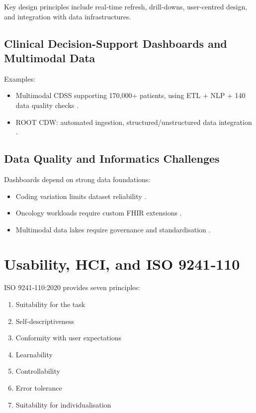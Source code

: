 Key design principles include real‑time refresh, drill‑downs, user-centred design, and integration with data infrastructures.

\subsection{Clinical Decision-Support Dashboards and Multimodal Data}

Examples:

\begin{itemize}
    \item Multimodal CDSS supporting 170,000+ patients, using ETL + NLP + 140 data quality checks \citep{chang2025}.
    \item ROOT CDW: automated ingestion, structured/unstructured data integration \citep{jung2021}.
\end{itemize}

\subsection{Data Quality and Informatics Challenges}

Dashboards depend on strong data foundations:

\begin{itemize}
    \item Coding variation limits dataset reliability \citep{varma2026}.
    \item Oncology workloads require custom FHIR extensions \citep{guilbert2024}.
    \item Multimodal data lakes require governance and standardisation \citep{conway2025}.
\end{itemize}

\section{Usability, HCI, and ISO 9241‑110}

ISO 9241‑110:2020 \citep{internationalorganizationforstandardization2020} provides seven principles:

\begin{enumerate}
    \item Suitability for the task
    \item Self-descriptiveness
    \item Conformity with user expectations
    \item Learnability
    \item Controllability
    \item Error tolerance
    \item Suitability for individualisation
\end{enumerate}

